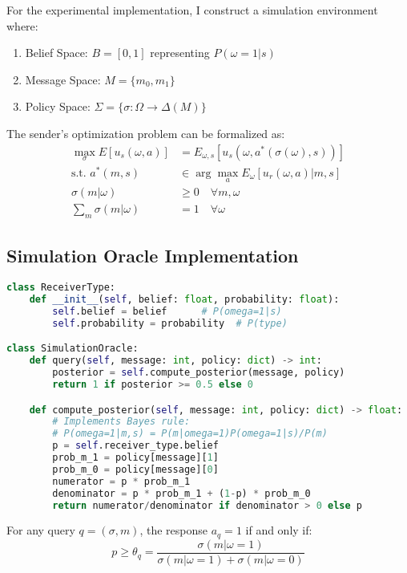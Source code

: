 \documentclass[12pt]{article}
\begin{document}
For the experimental implementation, I construct a simulation environment where:
\begin{enumerate}
    \item Belief Space: $B = [0,1]$ representing $P(\omega=1|s)$
    \item Message Space: $M = \{m_0, m_1\}$
    \item Policy Space: $\Sigma = \{\sigma: \Omega \rightarrow \Delta(M)\}$
\end{enumerate}

The sender's optimization problem can be formalized as:
\begin{align*}
    \max_\sigma E[u_s(\omega,a)] &= E_{\omega,s}[u_s(\omega,a^*(\sigma(\omega),s))] \\
    \text{s.t. } a^*(m,s) &\in \arg\max_a E_\omega[u_r(\omega,a)|m,s] \\
    \sigma(m|\omega) &\geq 0 \quad \forall m,\omega \\
    \sum_m \sigma(m|\omega) &= 1 \quad \forall\omega
\end{align*}

\subsection{Simulation Oracle Implementation}

\begin{lstlisting}[language=Python, caption=Core Implementation Classes]
class ReceiverType:
    def __init__(self, belief: float, probability: float):
        self.belief = belief      # P(omega=1|s)
        self.probability = probability  # P(type)

class SimulationOracle:
    def query(self, message: int, policy: dict) -> int:
        posterior = self.compute_posterior(message, policy)
        return 1 if posterior >= 0.5 else 0

    def compute_posterior(self, message: int, policy: dict) -> float:
        # Implements Bayes rule:
        # P(omega=1|m,s) = P(m|omega=1)P(omega=1|s)/P(m)
        p = self.receiver_type.belief
        prob_m_1 = policy[message][1]
        prob_m_0 = policy[message][0]
        numerator = p * prob_m_1
        denominator = p * prob_m_1 + (1-p) * prob_m_0
        return numerator/denominator if denominator > 0 else p
\end{lstlisting}

For any query $q = (\sigma, m)$, the response $a_q = 1$ if and only if:
\begin{equation}
    p \geq \theta_q = \frac{\sigma(m|\omega=1)}{\sigma(m|\omega=1) + \sigma(m|\omega=0)}
\end{equation}
\end{document}
